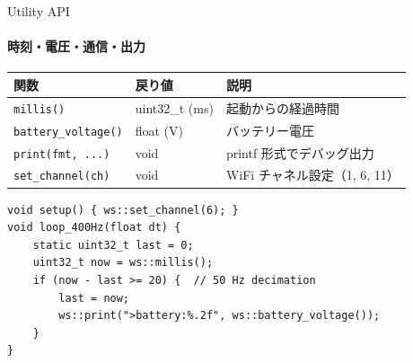 \documentclass[aspectratio=169, 14pt]{beamer}
\begin{document}
\begin{frame}[fragile]{Utility API}
  \framesubtitle{時刻・電圧・通信・出力}
  {\small
  \begin{tabular}{lll}
    \hline
    \textbf{関数} & \textbf{戻り値} & \textbf{説明} \\
    \hline
    \texttt{millis()}           & uint32\_t (ms) & 起動からの経過時間 \\
    \texttt{battery\_voltage()} & float (V)      & バッテリー電圧 \\
    \texttt{print(fmt, ...)}    & void           & printf 形式でデバッグ出力 \\
    \texttt{set\_channel(ch)}   & void           & WiFi チャネル設定（1, 6, 11） \\
    \hline
  \end{tabular}
  }

  \vspace{0.3em}

  \begin{lstlisting}[style=sfcpp, basicstyle=\ttfamily\scriptsize]
void setup() { ws::set_channel(6); }
void loop_400Hz(float dt) {
    static uint32_t last = 0;
    uint32_t now = ws::millis();
    if (now - last >= 20) {  // 50 Hz decimation
        last = now;
        ws::print(">battery:%.2f", ws::battery_voltage());
    }
}
  \end{lstlisting}
\end{frame}

\end{document}
